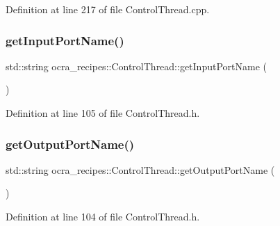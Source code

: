 Definition at line 217 of file Control\+Thread.\+cpp.

\hypertarget{classocra__recipes_1_1ControlThread_a1082fa50dfacb28ffc37f8daf6417649}{}\label{classocra__recipes_1_1ControlThread_a1082fa50dfacb28ffc37f8daf6417649} 
\subsubsection{\texorpdfstring{get\+Input\+Port\+Name()}{getInputPortName()}}
{\footnotesize\ttfamily std\+::string ocra\+\_\+recipes\+::\+Control\+Thread\+::get\+Input\+Port\+Name (\begin{DoxyParamCaption}{ }\end{DoxyParamCaption})\hspace{0.3cm}{\ttfamily [inline]}}



Definition at line 105 of file Control\+Thread.\+h.

\hypertarget{classocra__recipes_1_1ControlThread_a7d60403bfe70275c84d556985faac038}{}\label{classocra__recipes_1_1ControlThread_a7d60403bfe70275c84d556985faac038} 
\subsubsection{\texorpdfstring{get\+Output\+Port\+Name()}{getOutputPortName()}}
{\footnotesize\ttfamily std\+::string ocra\+\_\+recipes\+::\+Control\+Thread\+::get\+Output\+Port\+Name (\begin{DoxyParamCaption}{ }\end{DoxyParamCaption})\hspace{0.3cm}{\ttfamily [inline]}}



Definition at line 104 of file Control\+Thread.\+h.

\hypertarget{classocra__recipes_1_1ControlThread_aa7f0d827de6315ad83948620efc1630e}{}\label{classocra__recipes_1_1ControlThread_aa7f0d827de6315ad83948620efc1630e} 
